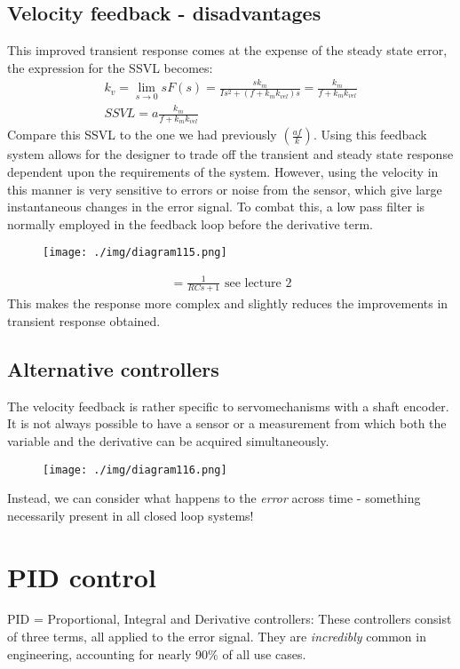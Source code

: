 \subsection{Velocity feedback - disadvantages}
This improved transient response comes at the expense of the steady state error, the expression for the SSVL becomes:
\begin{gather}
  k_v = \lim_{s\rightarrow 0} s F(s) = \frac{sk_m}{Is^2 + \left( f + k_m k_{vel}\right)s} = \frac{k_m}{f + k_m k_{vel}}\\
  SSVL = a \frac{k_m}{f + k_m k_{vel}}
\end{gather}
Compare this SSVL to the one we had previously $\left( \frac{af}{k}\right)$. Using this feedback system allows for the designer to trade off the transient and steady state response dependent upon the requirements of the system. However, using the velocity in this manner is very sensitive to errors or noise from the sensor, which give large instantaneous changes in the error signal. To combat this, a low pass filter is normally employed in the feedback loop before the derivative term.
\begin{figure}[H]
  \centerline{\texttt{[image: ./img/diagram115.png]}}
  \caption{}
\end{figure}
\begin{gather}
  = \frac{1}{RCs + 1} \textrm{ see lecture 2}
\end{gather}
This makes the response more complex and slightly reduces the improvements in transient response obtained.
\subsection{Alternative controllers}
The velocity feedback is rather specific to servomechanisms with a shaft encoder. It is not always possible to have a sensor or a measurement from which both the variable and the derivative can be acquired simultaneously.
\begin{figure}[H]
  \centerline{\texttt{[image: ./img/diagram116.png]}}
  \caption{}
\end{figure}
Instead, we can consider what happens to the \textit{error} across time - something necessarily present in all closed loop systems!
\section{PID control}
PID = Proportional, Integral and Derivative controllers: These controllers consist of three terms, all applied to the error signal. They are \textit{incredibly} common in engineering, accounting for nearly 90\% of all use cases.
